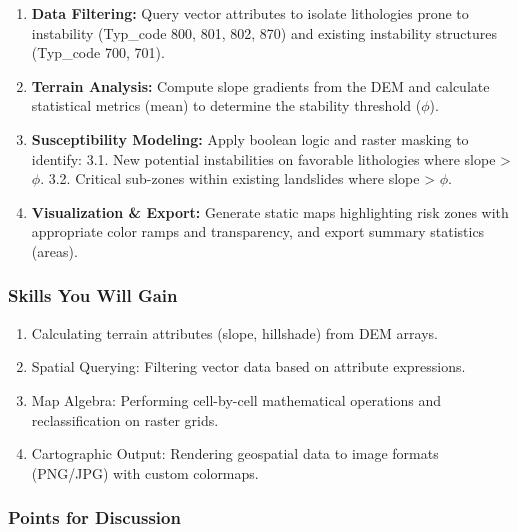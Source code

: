 \documentclass[
  letterpaper,
  DIV=11,
  numbers=noendperiod]{scrartcl}
\providecommand{\tightlist}{%
  \setlength{\itemsep}{0pt}\setlength{\parskip}{0pt}}
\begin{document}
\begin{tcolorbox}
\begin{enumerate}
\def\labelenumi{\arabic{enumi}.}
\item
  \textbf{Data Filtering:} Query vector attributes to isolate
  lithologies prone to instability (Typ\_code 800, 801, 802, 870) and
  existing instability structures (Typ\_code 700, 701).
\item
  \textbf{Terrain Analysis:} Compute slope gradients from the DEM and
  calculate statistical metrics (mean) to determine the stability
  threshold (\(\phi\)).
\item
  \textbf{Susceptibility Modeling:} Apply boolean logic and raster
  masking to identify: 3.1. New potential instabilities on favorable
  lithologies where slope \textgreater{} \(\phi\). 3.2. Critical
  sub-zones within existing landslides where slope \textgreater{}
  \(\phi\).
\item
  \textbf{Visualization \& Export:} Generate static maps highlighting
  risk zones with appropriate color ramps and transparency, and export
  summary statistics (areas).
\end{enumerate}

\subsubsection{Skills You Will Gain}\label{skills-you-will-gain}

\begin{enumerate}
\def\labelenumi{\arabic{enumi}.}
\tightlist
\item
  Calculating terrain attributes (slope, hillshade) from DEM arrays.
\item
  Spatial Querying: Filtering vector data based on attribute
  expressions.
\item
  Map Algebra: Performing cell-by-cell mathematical operations and
  reclassification on raster grids.
\item
  Cartographic Output: Rendering geospatial data to image formats
  (PNG/JPG) with custom colormaps.
\end{enumerate}

\subsubsection{Points for Discussion}\label{points-for-discussion}


\end{tcolorbox}
\end{document}
